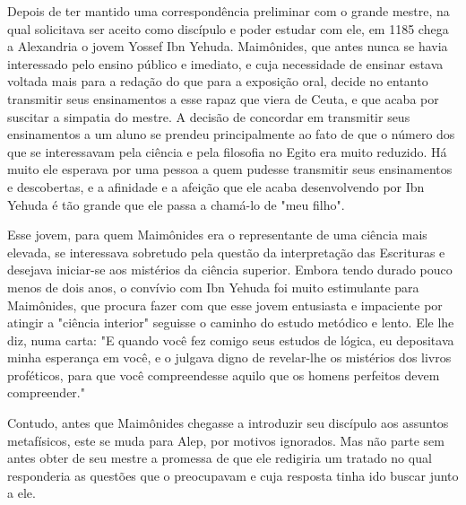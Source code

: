 \begin{itemize}
\begin{enumrate}
Depois de ter mantido uma correspondência preliminar com o grande
mestre, na qual solicitava ser aceito como discípulo e poder estudar com
ele, em 1185 chega a Alexandria o jovem Yossef Ibn Yehuda. Maimônides,
que an­tes nunca se havia interessado pelo ensino público e imediato, e
cuja necessi­dade de ensinar estava voltada mais para a redação do que
para a exposição oral, decide no entanto transmitir seus ensinamentos a
esse rapaz que viera de Ceuta, e que acaba por suscitar a simpatia do
mestre. A decisão de concordar em transmitir seus ensinamentos a um
aluno se prendeu principalmente ao fato de que o número dos que se
interessavam pela ciência e pela filosofia no Egito era muito reduzido.
Há muito ele esperava por uma pessoa a quem pudesse trans­mitir seus
ensinamentos e descobertas, e a afinidade e a afeição que ele acaba
desenvolvendo por Ibn Yehuda é tão grande que ele passa a chamá-lo de
"meu filho".

Esse jovem, para quem Maimônides era o representante de uma ciência mais
elevada, se interessava sobretudo pela questão da interpretação das
Escrituras e desejava iniciar-se aos mistérios da ciência superior.
Embora tendo durado pouco menos de dois anos, o convívio com Ibn Yehuda
foi muito esti­mulante para Maimônides, que procura fazer com que esse
jovem entusiasta e impaciente por atingir a "ciência interior" seguisse
o caminho do estudo me­tódico e lento. Ele lhe diz, numa carta: "E
quando você fez comigo seus estu­dos de lógica, eu depositava minha
esperança em você, e o julgava digno de revelar-lhe os mistérios dos
livros proféticos, para que você compreendesse aqui­lo que os homens
perfeitos devem compreender."

Contudo, antes que Maimônides chegasse a introduzir seu discípulo aos
assuntos metafísicos, este se muda para Alep, por motivos ignorados. Mas
não parte sem antes obter de seu mestre a promessa de que ele redigiria
um tratado no qual responderia as questões que o preocupavam e cuja
resposta ti­nha ido buscar junto a ele.


\end{enumrate}
\end{itemize}
